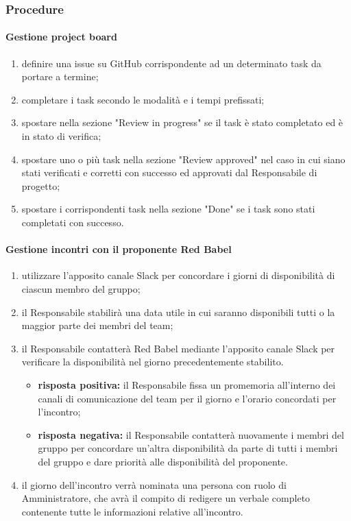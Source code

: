 	\subsubsection{Procedure}
 	\paragraph{Gestione project board}
	\begin{enumerate}
		\item definire una issue su GitHub corrispondente ad un determinato task da portare a termine;
		\item completare i task secondo le modalità e i tempi prefissati;
		\item spostare nella sezione "Review in progress" se il task è stato completato ed è in stato di verifica;
		\item spostare uno o più task nella sezione "Review approved" nel caso in cui siano stati verificati e corretti con successo ed approvati dal Responsabile di progetto;
		\item spostare i corrispondenti task nella sezione "Done" se i task sono stati completati con successo.
	\end{enumerate}

	\paragraph{Gestione incontri con il proponente Red Babel}
	\begin{enumerate}
		\item utilizzare l'apposito canale Slack per concordare i giorni di disponibilità di ciascun membro del gruppo;
		\item il Responsabile stabilirà una data utile in cui saranno disponibili tutti o la maggior parte dei membri del team;
		\item il Responsabile contatterà Red Babel mediante l'apposito canale Slack per verificare la disponibilità nel giorno precedentemente stabilito.
		\begin{itemize}
			\item \textbf{risposta positiva:} il Responsabile fissa un promemoria all'interno dei canali di comunicazione del team per il giorno e l'orario concordati per l'incontro;
			\item \textbf{risposta negativa:} il Responsabile contatterà nuovamente i membri del gruppo per concordare un'altra disponibilità da parte di tutti i membri del gruppo e dare priorità alle disponibilità del proponente.
		\end{itemize}
		\item il giorno dell'incontro verrà nominata una persona con ruolo di Amministratore, che avrà il compito di redigere un verbale completo contenente tutte le informazioni relative all'incontro.
	\end{enumerate}

